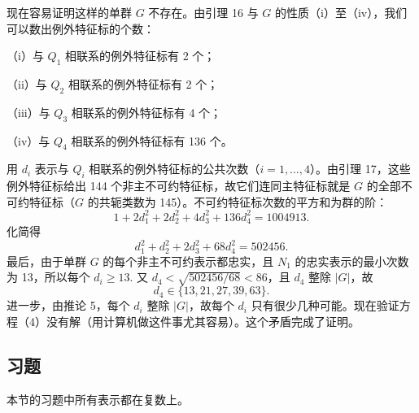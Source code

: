 现在容易证明这样的单群 \(G\) 不存在。由引理 16 与 \(G\) 的性质（i）至（iv），我们可以数出例外特征标的个数：

（i）与 \(Q_1\) 相联系的例外特征标有 2 个；

（ii）与 \(Q_2\) 相联系的例外特征标有 2 个；

（iii）与 \(Q_3\) 相联系的例外特征标有 4 个；

（iv）与 \(Q_4\) 相联系的例外特征标有 136 个。

用 \(d_i\) 表示与 \(Q_i\) 相联系的例外特征标的公共次数（\(i = 1, \ldots, 4\)）。由引理 17，这些例外特征标给出 144 个非主不可约特征标，故它们连同主特征标就是 \(G\) 的全部不可约特征标（\(G\) 的共轭类数为 145）。不可约特征标次数的平方和为群的阶：
\[
1+2d_1^2+2d_2^2+4d_3^2+136d_4^2 = 1004913.
\]
化简得
\[
d_1^2+d_2^2+2d_3^2+68d_4^2 = 502456. \tag{19.4}
\]
最后，由于单群 \(G\) 的每个非主不可约表示都忠实，且 \(N_1\) 的忠实表示的最小次数为 13，所以每个 \(d_i \geq 13\). 又 \(d_4 < \sqrt{502456/68} < 86\)，且 \(d_4\) 整除 \(|G|\)，故
\[
d_4 \in \{13, 21, 27, 39, 63\}.
\]
进一步，由推论 5，每个 \(d_i\) 整除 \(|G|\)，故每个 \(d_i\) 只有很少几种可能。现在验证方程（4）没有解（用计算机做这件事尤其容易）。这个矛盾完成了证明。

\subsection*{习题}

本节的习题中所有表示都在复数上。

